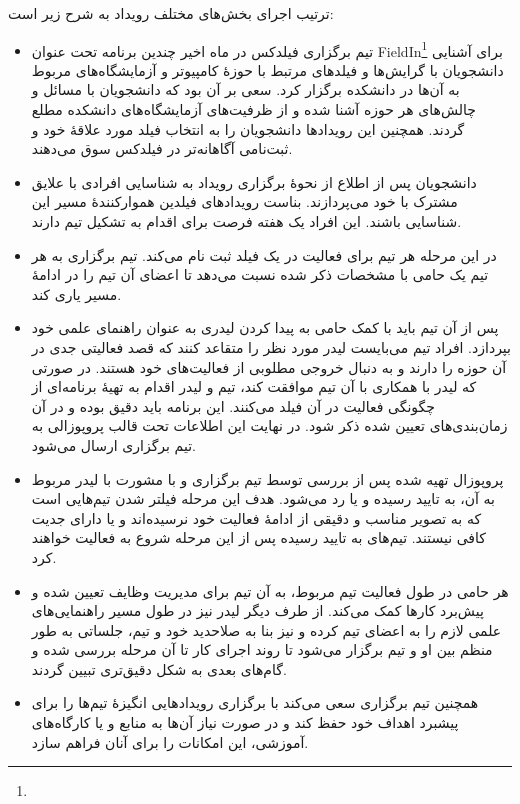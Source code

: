\documentclass{article}
\begin{document}
ترتیب اجرای بخش‌های مختلف رویداد به شرح زیر است:
\begin{itemize}
\item
تیم برگزاری فیلدکس در ماه اخیر چندین برنامه تحت عنوان FieldIn\footnote{} برای آشنایی دانشجویان با گرایش‌ها و فیلدهای مرتبط با حوزه‌ٔ کامپیوتر و آزمایشگاه‌های مربوط به آن‌ها در دانشکده برگزار کرد. سعی بر آن بود که دانشجویان با مسائل و چالش‌های هر حوزه آشنا شده و از ظرفیت‌های آزمایشگاه‌های دانشکده مطلع گردند. همچنین این رویدادها دانشجویان را به انتخاب فیلد مورد علاقه‌ٔ خود و ثبت‌نامی آگاهانه‌تر در فیلدکس سوق می‌دهند.
\item
دانشجویان پس از اطلاع از نحوهٔ برگزاری رویداد به شناسایی افرادی با علایق مشترک با خود می‌پردازند. بناست رویدادهای فیلدین هموارکنندهٔ مسیر این شناسایی باشند. این افراد یک هفته فرصت برای اقدام به تشکیل تیم دارند.
\item
در این مرحله هر تیم برای فعالیت در یک فیلد ثبت ‌نام می‌کند. تیم برگزاری به هر تیم یک حامی با مشخصات ذکر شده نسبت می‌دهد تا اعضای آن تیم را در ادامه‌ٔ مسیر یاری کند.
\item
پس از آن تیم باید با کمک حامی به پیدا کردن لیدری به عنوان راهنمای علمی خود بپردازد. افراد تیم می‌بایست لیدر مورد نظر را متقاعد کنند که قصد فعالیتی جدی در آن حوزه را دارند و به دنبال خروجی مطلوبی از فعالیت‌های خود هستند. در صورتی که لیدر با همکاری با آن تیم موافقت کند، تیم و لیدر اقدام به تهیه‌ٔ برنامه‌ای از چگونگی فعالیت در آن فیلد می‌کنند. این برنامه باید دقیق بوده و در آن زمان‌بندی‌های تعیین شده ذکر شود. در نهایت این اطلاعات تحت قالب پروپوزالی به تیم برگزاری ارسال می‌شود.
\item
پروپوزال تهیه شده پس از بررسی توسط تیم برگزاری و با مشورت با  لیدر مربوط به آن، به تایید رسیده و یا رد می‌شود. هدف این مرحله فیلتر شدن تیم‌هایی است که به تصویر مناسب و دقیقی از ادامه‌ٔ فعالیت خود نرسیده‌اند و یا دارای جدیت کافی نیستند.
تیم‌های به تایید رسیده پس از این مرحله شروع به فعالیت خواهند کرد.
\item
هر حامی در طول فعالیت تیم مربوط، به آن تیم برای مدیریت وظایف تعیین شده و پیش‌برد کارها کمک می‌کند. از طرف دیگر لیدر نیز در طول مسیر راهنمایی‌های علمی لازم را به اعضای تیم کرده و نیز بنا به صلاحدید خود و تیم، جلساتی به طور منظم بین او و تیم برگزار‌ می‌شود تا روند اجرای کار تا آن مرحله بررسی شده و گام‌های بعدی به شکل دقیق‌تری تبیین گردند.
\item
همچنین تیم برگزاری سعی می‌کند با برگزاری رویدادهایی انگیزه‌ٔ تیم‌ها را برای پیشبرد اهداف خود حفظ کند و در صورت نیاز آن‌ها به منابع و  یا کارگاه‌های آموزشی، این امکانات را برای آنان فراهم سازد. 
\end{itemize}
\end{document}
